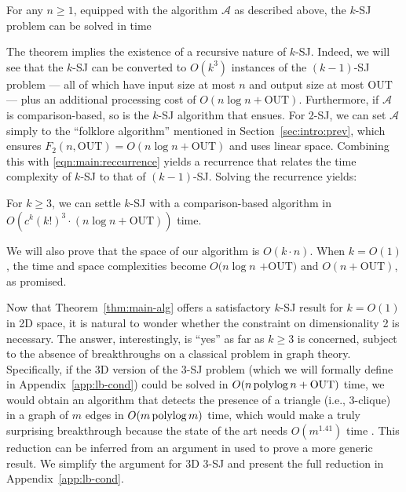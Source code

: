 \documentclass[sigconf]{acmart}
\def\vgap{\vspace{1mm}}
\def\A{\mathcal{A}}
\def\out{\mathrm{OUT}}
\begin{document}
\begin{theorem} \label{thm:main-recur}
    For any $n \ge 1$, equipped with the algorithm $\A$ as described above, the $k$-SJ problem can be solved in time
    \myeqn{
        O(k^3) \cdot \big( F_{k-1}(n, \out) + n \log n + \out \big).
        \label{eqn:main:reccurrence}
    }
\end{theorem}

The theorem implies the existence of a recursive nature of $k$-SJ. Indeed, we will see that the $k$-SJ can be converted to $O(k^3)$ instances of the $(k-1)$-SJ problem --- all of which have input size at most $n$ and output size at most $\out$ --- plus an additional processing cost of $O(n \log n + \out)$. Furthermore, if $\A$ is comparison-based, so is the $k$-SJ algorithm that ensues. For 2-SJ, we can set $\A$ simply to the ``folklore algorithm'' mentioned in Section~\ref{sec:intro:prev}, which ensures $F_2(n, \out) = O(n \log n + \out)$ and uses linear space. Combining this with \eqref{eqn:main:reccurrence} yields a recurrence that relates the time complexity of $k$-SJ to that of $(k-1)$-SJ. Solving the recurrence yields:

\begin{theorem} \label{thm:main-alg}
    For $k \ge 3$, we can settle $k$-SJ with a comparison-based algorithm in $O( c^k (k!)^3 \cdot (n \log n + \out))$ time.
\end{theorem}


We will also prove that the space of our algorithm is $O(k \cdot n)$. When $k = O(1)$, the time and space complexities become $O(n \log n$ $+ \out)$ and $O(n + \out)$, as promised.

\vgap 

Now that Theorem~\ref{thm:main-alg} offers a satisfactory $k$-SJ result for $k = O(1)$ in 2D space, it is natural to wonder whether the constraint on dimensionality 2 is necessary. The answer, interestingly, is ``yes'' as far as $k \ge 3$ is concerned, subject to the absence of breakthroughs on a classical problem in graph theory. Specifically, if the 3D version of the 3-SJ problem (which we will formally define in Appendix~\ref{app:lb-cond}) could be solved in $O(n \polylog n + \out)$ time, we would obtain an algorithm that detects the presence of a triangle (i.e., 3-clique) in a graph of $m$ edges in $O(m \operatorname*{polylog} m)$ time, which would make a truly surprising breakthrough because the state of the art needs $O(m^{1.41})$ time \cite{ayz97}. This reduction can be inferred from an argument in \cite{kcko22} used to prove a more generic result. We simplify the argument for 3D 3-SJ and present the full reduction in Appendix~\ref{app:lb-cond}.
\end{document}
